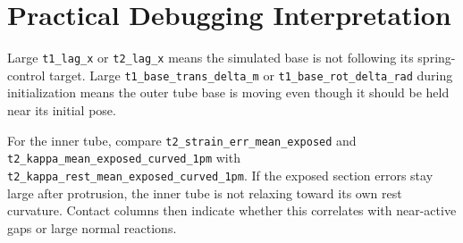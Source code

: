 \documentclass[11pt,a4paper]{article}
\newcommand{\field}[1]{\nolinkurl{#1}}
\begin{document}
\section{Practical Debugging Interpretation}

Large \field{t1_lag_x} or \field{t2_lag_x} means the simulated base is not
following its spring-control target. Large \field{t1_base_trans_delta_m} or
\field{t1_base_rot_delta_rad} during initialization means the outer tube base
is moving even though it should be held near its initial pose.

For the inner tube, compare \field{t2_strain_err_mean_exposed} and
\field{t2_kappa_mean_exposed_curved_1pm} with
\field{t2_kappa_rest_mean_exposed_curved_1pm}. If the exposed section errors
stay large after protrusion, the inner tube is not relaxing toward its own
rest curvature. Contact columns then indicate whether this correlates with
near-active gaps or large normal reactions.
\end{document}

